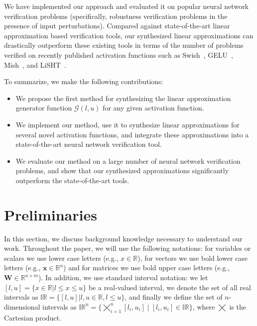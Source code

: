 We have implemented our approach and evaluated it on popular neural
network verification problems (specifically, robustness verification problems in the presence of input perturbations).
Compared against state-of-the-art linear approximation based
verification tools, our synthesized linear approximations can drastically
outperform these existing tools in terms of the number of problems verified on
recently published activation functions such as Swish~\cite{ramachandran2017searching},
GELU~\cite{hendrycks2016gaussian}, Mish~\cite{misra2019mish}, and
LiSHT~\cite{roy2019lisht}.

To summarize, we make the following contributions:
\begin{itemize}
	\item We propose the first method for synthesizing the linear
	approximation generator function $ \mathcal{G}(l, u) $ for any given activation function.
	\item We implement our method, use it to synthesize linear approximations
	for several novel activation functions, and integrate these approximations
	into a state-of-the-art neural network verification tool.
	\item We evaluate our method on a large number of neural network
	verification problems, and
	show that our synthesized approximations significantly outperform
	the state-of-the-art tools.
\end{itemize}



\section{Preliminaries}
\label{offlinesyn:sec:preliminaries}

In this section, we discuss background knowledge necessary to understand our
work. Throughout the paper, we will use the following notations: for variables or scalars we use lower
case letters (e.g., $ x \in \mathbb{R} $), for vectors we use bold lower case
letters (e.g., $ \mathbf{x} \in \mathbb{R}^n $) and for matrices we use bold
upper case letters (e.g., $ \mathbf{W} \in \mathbb{R}^{n \times m} $). In
addition, we use standard interval notation: we let $ [l,u] = \{x \in
\mathbb{R}| l \leq x \leq u \} $ be a real-valued interval, we denote the set
of all real intervals as $
\mathbb{IR} = \{[l,u] | l, u \in \mathbb{R}, l \leq u\} $, and finally we
define the set of $ n $-dimensional intervals as
$ \mathbb{IR}^n = \{
\bigtimes_{i=1}^n [l_i, u_i] \; | \; [l_i, u_i] \in \mathbb{IR} \} $, where $
\bigtimes $ is the Cartesian product.

